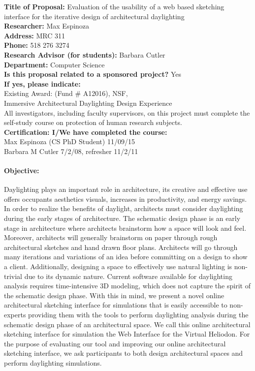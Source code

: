 \documentclass[12pt]{article}
\begin{document}
\noindent
{\bf Title of Proposal:} Evaluation of the usability of a web based 
sketching interface for the iterative design of architectural daylighting \\
{\bf Researcher:}   Max Espinoza\\
{\bf Address:}  MRC 311\\
{\bf Phone:} 518 276 3274\\ 
{\bf Research Advisor (for students):}  Barbara Cutler \\
{\bf Department:}  Computer Science \\
{\bf Is this proposal related to a sponsored project?}  Yes \\
{\bf If yes,  please indicate:}  \\
Existing Award: (Fund \# A12016), NSF, \\
Immersive Architectural Daylighting Design Experience \\

\noindent
All investigators, including faculty supervisors, on this project must
complete the self-study course on protection of human research
subjects. \\
{\bf Certification:  I/We have completed the course:} \\
Max Espinoza (CS PhD Student) 11/09/15 \\ 
Barbara M Cutler 7/2/08, refresher 11/2/11 %

\paragraph{Objective:}

Daylighting plays an important role in architecture, its creative and effective use offers occupants aesthetics visuals, increases in productivity, and energy savings. 
In order to realize the benefits of daylight, architects must consider daylighting during the early stages of architecture.
The schematic design phase is an early stage in architecture where architects brainstorm how a space will look and feel. 
Moreover, architects will generally brainstorm on paper through rough architectural sketches and hand drawn floor plans.
Architects will go through many iterations and variations of an idea before committing on a design to show a client.
Additionally, designing a space to effectively use natural lighting is non-trivial  due to its dynamic nature. 
Current software available for daylighting analysis requires time-intensive 3D modeling, which does not capture the spirit of the schematic design phase.
With this in mind, we present a novel online architectural sketching interface for simulations that is easily accessible to non-experts providing them with the tools to perform daylighting analysis during the schematic design phase of an architectural space.
We call this online architectural sketching interface for simulation the Web Interface for the Virtual Heliodon.
For the purpose of evaluating our tool and improving our online architectural sketching interface, we ask participants to both design architectural spaces and perform daylighting simulations.
\end{document}
